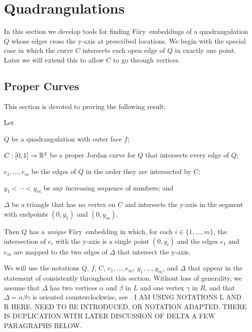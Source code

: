 \documentclass{patmorin}
\newcommand{\Fary}{Fáry}
\begin{document}
\section{Quadrangulations}

In this section we develop tools for finding \Fary\ embeddings of
a quadrangulation $Q$ whose edges cross the y-axis at prescribed
locations. We begin with the special case in which the curve $C$
intersects each open edge of $Q$ in exactly one point.
Later we will extend this to allow $C$ to go through vertices.



\subsection{Proper Curves}

This section is devoted to proving the following result:

\begin{thm}
    Let
    \begin{compactitem}
    \item $Q$ be a quadrangulation with outer face $f$; 
    \item $C:[0,1]\to\mathbb{R}^2$ be a proper Jordan curve for $Q$
     that intersects every edge of $Q$;
    \item $e_1,\ldots,e_m$ be the edges of $Q$ in the
    order they are intersected by $C$; 
    \item $y_1<\cdots<y_m$
    be any increasing sequence of numbers; and
    \item $\Delta$ be a triangle that has no vertex on $C$ and intersects the y-axis
     in the segment with endpoints $(0,y_1)$ and $(0,y_m)$.
    \end{compactitem}
    Then $Q$ has a 
\emph{unique}
\Fary\ embedding in which, for each
    $i\in\{1,\ldots,m\}$, the intersection of $e_i$ with the y-axis is
    a single point $(0,y_i)$ and the edges $e_1$ and $e_m$ are mapped
    to the two edges of $\Delta$ that intersect the y-axis.
\end{thm}

We will use the notations $Q$, $f$, $C$, $e_1,\ldots,e_m$,
$y_1,\ldots,y_m$, and $\Delta$ that appear in the statement of
 consistently throughout this section.
Without loss of generality, we assume that  $\Delta$ %
 has two
vertices $\alpha$
and $\beta$
 in $L$ and one vertex $\gamma$ in $R$,
and that   $\Delta=\alpha\beta\gamma$ is oriented counterclockwise,
see .
I AM USING NOTATIONS L AND R HERE. NEED TO BE INTRODUCED, OR NOTATION ADAPTED.
THERE IS DUPLICATION WITH LATER DISCUSSION OF DELTA A FEW PARAGRAPHS BELOW.
\end{document}
